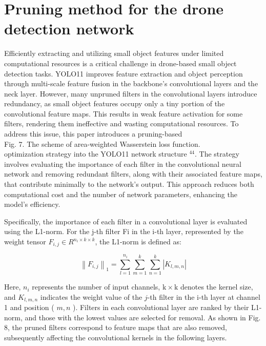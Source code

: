 \documentclass{article}
\begin{document}
\section*{Pruning method for the drone detection network}
Efficiently extracting and utilizing small object features under limited computational resources is a critical challenge in drone-based small object detection tasks. YOLO11 improves feature extraction and object perception through multi-scale feature fusion in the backbone's convolutional layers and the neck layer. However, many unpruned filters in the convolutional layers introduce redundancy, as small object features occupy only a tiny portion of the convolutional feature maps. This results in weak feature activation for some filters, rendering them ineffective and wasting computational resources. To address this issue, this paper introduces a pruning-based\\

Fig. 7. The scheme of area-weighted Wasserstein loss function.\\
optimization strategy into the YOLO11 network structure ${ }^{44}$. The strategy involves evaluating the importance of each filter in the convolutional neural network and removing redundant filters, along with their associated feature maps, that contribute minimally to the network's output. This approach reduces both computational cost and the number of network parameters, enhancing the model's efficiency.

Specifically, the importance of each filter in a convolutional layer is evaluated using the L1-norm. For the j-th filter Fi in the i-th layer, represented by the weight tensor $F_{i, j} \in R^{n_{i} \times k \times k}$, the L1-norm is defined as:


\begin{equation*}
\left\|F_{i, j}\right\|_{1}=\sum_{l=1}^{n_{i}} \sum_{m=1}^{k} \sum_{n=1}^{k}\left|K_{l, m, n}\right| \tag{19}
\end{equation*}


Here, $n_{i}$ represents the number of input channels, $\mathrm{k} \times \mathrm{k}$ denotes the kernel size, and $K_{l, m, n}$ indicates the weight value of the $j$-th filter in the i-th layer at channel 1 and position ( $m, n$ ). Filters in each convolutional layer are ranked by their L1-norm, and those with the lowest values are selected for removal. As shown in Fig. 8, the pruned filters correspond to feature maps that are also removed, subsequently affecting the convolutional kernels in the following layers.
\end{document}
